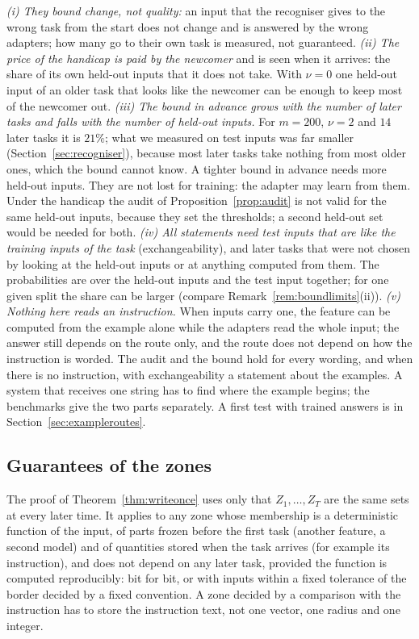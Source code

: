 \begin{remark}
\label{rem:auditlimits}
\emph{(i) They bound change, not quality:} an input that the recogniser gives to the wrong task from the start does not change and is answered by the wrong adapters; how many go to their own task is measured, not guaranteed.
\emph{(ii) The price of the handicap is paid by the newcomer} and is seen when it arrives: the share of its own held-out inputs that it does not take. With $\nu = 0$ one held-out input of an older task that looks like the newcomer can be enough to keep most of the newcomer out.
\emph{(iii) The bound in advance grows with the number of later tasks and falls with the number of held-out inputs.} For $m = 200$, $\nu = 2$ and $14$ later tasks it is $21\%$; what we measured on test inputs was far smaller (Section~\ref{sec:recogniser}), because most later tasks take nothing
from most older ones, which the bound cannot know. A tighter bound in advance needs more held-out
inputs. They are not lost for training: the adapter may learn from them. Under the handicap the
audit of Proposition~\ref{prop:audit} is not valid for the same held-out inputs, because they set
the thresholds; a second held-out set would be needed for both.
\emph{(iv) All statements need test inputs that are like the training inputs of the task}
(exchangeability), and later tasks that were not chosen by looking at the held-out inputs or at
anything computed from them. The probabilities are over the held-out inputs and the test input
together; for one given split the share can be larger (compare
Remark~\ref{rem:boundlimits}(ii)).
\emph{(v) Nothing here reads an instruction.} When inputs carry one, the feature can be computed from the example alone while the adapters read the whole input; the answer still depends on the route only, and the route does not depend on how the instruction is worded. The audit and the bound hold for every wording, and when there is no instruction, with exchangeability a statement about the examples. A system that receives one string has to find where the example begins; the benchmarks give the two parts separately. A first test with trained answers is in Section~\ref{sec:exampleroutes}.
\end{remark}

\subsection{Guarantees of the zones}
\begin{remark}
\label{rem:otherzones}
The proof of Theorem~\ref{thm:writeonce} uses only that $Z_1,\dots,Z_T$ are the same sets at every later time. It applies to any zone whose membership is a deterministic function of the input, of parts frozen before the first task (another feature, a second model) and of quantities stored when the task arrives (for example its instruction), and does not depend on any later task, provided the function is computed reproducibly: bit for bit, or with inputs within a fixed tolerance of the border decided by a fixed convention. A zone decided by a comparison with the instruction has to store the instruction text, not one vector, one radius and one integer.
\end{remark}


